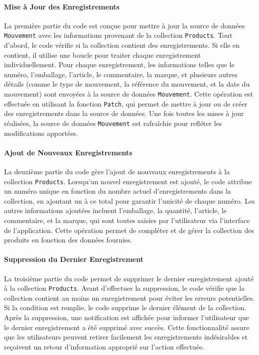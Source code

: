 \documentclass[a4paper, oneside, 12pt, final]{extreport}
\begin{document}
\paragraph{Mise à Jour des Enregistrements}
La première partie du code est conçue pour mettre à jour la source de données \texttt{Mouvement} avec les informations provenant de la collection \texttt{Products}. Tout d'abord, le code vérifie si la collection contient des enregistrements. Si elle en contient, il utilise une boucle pour traiter chaque enregistrement individuellement. Pour chaque enregistrement, les informations telles que le numéro, l'emballage, l'article, le commentaire, la marque, et plusieurs autres détails (comme le type de mouvement, la référence du mouvement, et la date du mouvement) sont envoyées à la source de données \texttt{Mouvement}. Cette opération est effectuée en utilisant la fonction \texttt{Patch}, qui permet de mettre à jour ou de créer des enregistrements dans la source de données. Une fois toutes les mises à jour réalisées, la source de données \texttt{Mouvement} est rafraîchie pour refléter les modifications apportées.

\paragraph{Ajout de Nouveaux Enregistrements}
La deuxième partie du code gère l'ajout de nouveaux enregistrements à la collection \texttt{Products}. Lorsqu'un nouvel enregistrement est ajouté, le code attribue un numéro unique en fonction du nombre actuel d'enregistrements dans la collection, en ajoutant un à ce total pour garantir l'unicité de chaque numéro. Les autres informations ajoutées incluent l'emballage, la quantité, l'article, le commentaire, et la marque, qui sont toutes saisies par l'utilisateur via l'interface de l'application. Cette opération permet de compléter et de gérer la collection des produits en fonction des données fournies.

\paragraph{Suppression du Dernier Enregistrement}
La troisième partie du code permet de supprimer le dernier enregistrement ajouté à la collection \texttt{Products}. Avant d'effectuer la suppression, le code vérifie que la collection contient au moins un enregistrement pour éviter les erreurs potentielles. Si la condition est remplie, le code supprime le dernier élément de la collection. Après la suppression, une notification est affichée pour informer l'utilisateur que le dernier enregistrement a été supprimé avec succès. Cette fonctionnalité assure que les utilisateurs peuvent retirer facilement les enregistrements indésirables et reçoivent un retour d'information approprié sur l'action effectuée.
\end{document}
